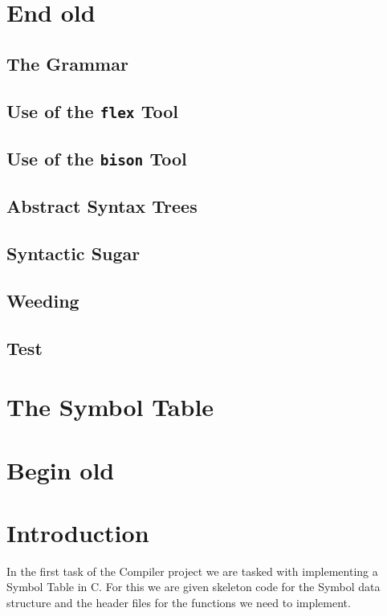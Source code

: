 \documentclass[a4paper,10pt,titlepage]{report}
\begin{document}
\section{End old}
\subsection{The Grammar}

\subsection{Use of the {\tt flex} Tool}

\subsection{Use of the {\tt bison} Tool}

\subsection{Abstract Syntax Trees}

\subsection{Syntactic Sugar}

\subsection{Weeding}

\subsection{Test}

\section{The Symbol Table}
\section{Begin old}
\section{Introduction}
In the first task of the Compiler project we are tasked with implementing a Symbol Table in C. For this we are given skeleton code for the Symbol data structure and the header files for the functions we need to implement.
\end{document}
